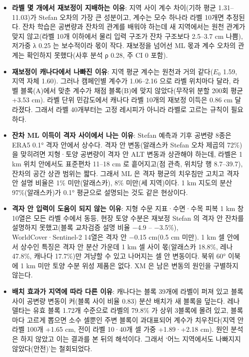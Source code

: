 \begin{itemize}[leftmargin=1.4em, itemsep=0.25em]
  \item \textbf{라벨 몇 개에서 재보정이 지배하는 이유}: 지역 사이 계수 차이(기하 평균 1.31–11.03)가 Stefan 오차의 가장 큰 성분이고, 계수는 모수 하나라 라벨 10개면 추정된다. 잔차 학습은 공변량과 잔차의 관계를 배워야 하는데 새 지역에서는 원천 관계가 맞지 않고(라벨 10개 이하에서 물리 입력 구조가 잔차 구조보다 2.5–3.7 cm 나쁨), 저가중 λ 0.25 는 보수적이라 몫이 작다. 재보정을 넘어선 ML 몫과 계수 오차의 관계는 확인하지 못했다(사후 분석 ρ 0.28, 주 CI 0 포함).
  \item \textbf{재보정이 캐나다에서 나빠진 이유}: 지역 평균 계수는 원천과 거의 같다($E_0$ 1.59, 지역 자체 1.60). 그러나 캠페인별 계수가 1.06–2.16 으로 라벨 위치마다 달라, 라벨 블록(A)에서 맞춘 계수가 채점 블록(B)에 맞지 않았다(무작위 분할 200회 평균 +3.53 cm). 라벨 단위 민감도에서 캐나다 라벨 10개의 재보정 이득은 0.86 cm 달라졌다. 그래서 라벨 40개부터는 고정 레시피가 아니라 라벨로 고르는 규칙이 필요하다.
  \item \textbf{잔차 ML 이득이 격자 사이에서 나는 이유}: Stefan 예측과 기후 공변량 8종은 ERA5 0.1° 격자 안에서 상수다. 격자 안 변동(알래스카 Stefan 오차 제곱의 72\%)을 맞히려면 지형·토양 공변량이 격자 안 ALT 변동과 상관해야 하는데, 라벨은 1 km 위치 안에서도 표준편차 11–18 cm 로 흩어지고(점 관측, 위치당 행 8.7–39.7), 잔차의 공간 상관 범위는 짧다. 그래서 ML 은 격자 평균의 치우침만 고치고 격자 안 설명 비율은 1\% 미만(알래스카), 8\% 미만(세 지역)이다. 1 km 지도의 분산 97\%(알래스카)가 0.1° 평균으로 설명되는 것도 같은 현상이다.
  \item \textbf{격자 안 입력이 도움이 되지 않는 이유}: 지형 수문 지표·수면·수목 피복 1 km 창 10열은 모든 라벨 수에서 동등, 현장 토양 수분은 재보정 Stefan 의 격자 안 잔차를 설명하지 못했고(블록 교차검증 설명 비율 −4.9 – −3.5\%), WorldCover·Sentinel-2 14열은 격자 안 −0.15 cm(0.5 cm 미만). 1 km 셀 안에서 상수인 특징은 격자 안 분산 가운데 1 km 셀 사이 몫(알래스카 18.8\%, 레나 47.8\%, 캐나다 17.7\%)만 겨냥할 수 있고 나머지는 셀 안 변동이다. 북위 60° 이북에 1 km 미만 토양 수분 위성 제품은 없다. XM 은 남은 변동의 원인을 구별하지 않는다.
  \item \textbf{배치 효과가 지역에 따라 다른 이유}: 캐나다는 블록 39개에 라벨이 퍼져 있고 블록 사이 공변량 변동이 커(블록 사이 비율 0.83) 분산 배치가 새 블록을 덮는다. 레나델타는 유효 블록 1.72개 수준으로 라벨의 79.8\% 가 상위 3블록에 몰려 있고, 블록마다 고르게 뽑으면 소수 셀뿐인 주변 블록이 과대표되어 계수가 치우친다(지역 안 라벨 100개 +1.65 cm, 전이 라벨 10·40개 셀 가중 +1.89·+2.18 cm). 원인 분석은 하지 않았고 이는 결과를 본 뒤의 해석이다. 그래서 ‘어느 지역에서도 나빠지지 않았다(안전)’는 철회되었다.

\end{itemize}
